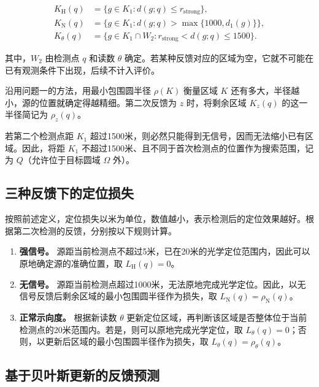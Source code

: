 \begin{equation}
\begin{aligned}
K_{\mathrm H}(q)&=\{g\in K_1:d(g;q)\le r_{\mathrm{strong}}\},\\
K_{\mathrm N}(q)&=\{g\in K_1:d(g;q)>\max\{1000,d_1(g)\}\},\\
K_\theta(q)&=\{g\in K_1\cap W_2:r_{\mathrm{strong}}<d(g;q)\le1500\}.
\end{aligned}
\label{eq:q2-pair-regions}
\end{equation}

其中，\(W_2\) 由检测点 \(q\) 和读数 \(\theta\) 确定。若某种反馈对应的区域为空，它就不可能在已有观测条件下出现，后续不计入评价。

沿用问题一的方法，用最小包围圆半径 \(\rho(K)\) 衡量区域 \(K\) 还有多大，半径越小，源的位置就确定得越精细。第二次反馈为 \(z\) 时，将剩余区域 \(K_z(q)\) 的这一半径简记为 \(\rho_z(q)\)。

若第二个检测点距 \(K_1\) 超过1500米，则必然只能得到无信号，因而无法缩小已有区域。因此，将距 \(K_1\) 不超过1500米、且不同于首次检测点的位置作为搜索范围，记为 \(Q\)（允许位于目标圆域 \(\Omega\) 外）。

\subsection{三种反馈下的定位损失}

按照前述定义，定位损失以米为单位，数值越小，表示检测后的定位效果越好。根据第二次检测的反馈，分别按以下规则计算。

\begin{enumerate}[label=(\arabic*),leftmargin=2.2em]
  \item \textbf{强信号。} 源距当前检测点不超过5米，已在20米的光学定位范围内，因此可以原地确定源的准确位置，取 \(L_{\mathrm H}(q)=0\)。
  \item \textbf{无信号。} 源距当前检测点超过1000米，无法原地完成光学定位。因此，以无信号反馈后剩余区域的最小包围圆半径作为损失，取 \(L_{\mathrm N}(q)=\rho_{\mathrm N}(q)\)。
  \item \textbf{正常示向度。} 根据新读数 \(\theta\) 更新定位区域，再判断该区域是否整体位于当前检测点的20米范围内。若是，则可以原地完成光学定位，取 \(L_\theta(q)=0\)；否则，以更新后区域的最小包围圆半径作为损失，取 \(L_\theta(q)=\rho_\theta(q)\)。
\end{enumerate}

\subsection{基于贝叶斯更新的反馈预测}


